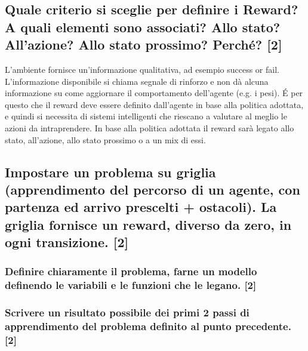 \documentclass[\main/main.tex]{subfiles}
\begin{document}
\subsection{Quale criterio si sceglie per definire i Reward? A quali elementi sono associati? Allo stato? All'azione? Allo stato prossimo? Perché? [2]}
L'ambiente fornisce un'informazione qualitativa, ad esempio success or fail.
L'informazione disponibile si chiama segnale di rinforzo e non dà alcuna informazione su come aggiornare il comportamento dell'agente (e.g. i pesi).
É per questo che il reward deve essere definito dall'agente in base alla politica adottata, e quindi si necessita di sistemi intelligenti che riescano a valutare al meglio le azioni da intraprendere.
In base alla politica adottata il reward sarà legato allo stato, all'azione, allo stato prossimo o a un mix di essi.

\subsection{Impostare un problema su griglia (apprendimento del percorso di un agente, con partenza ed arrivo prescelti + ostacoli). La griglia fornisce un reward, diverso da zero, in ogni transizione. [2]}
\subsubsection{Definire chiaramente il problema, farne un modello definendo le variabili e le funzioni che le legano. [2]}
\subsubsection{Scrivere un risultato possibile dei primi 2 passi di apprendimento del problema definito al punto precedente. [2]}
\end{document}

